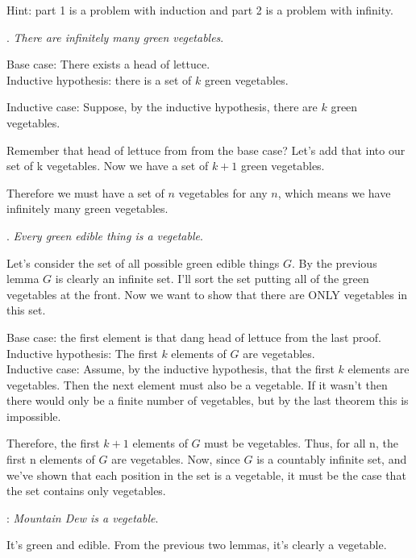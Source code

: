 \documentclass[basic, header]{nosvagor-notes}
\begin{document}
\begin{enumerate}[itemsep=4em]
    Hint: part 1 is a problem with induction and part 2 is a problem with
    infinity.

    . \textit{There are infinitely many green vegetables}.


    Base case: There exists a head of lettuce.\\
    Inductive hypothesis: there is a set of \(k\) green vegetables.\\

    Inductive case: Suppose, by the inductive hypothesis, there are \(k\) green vegetables.

    Remember that head of lettuce from from the base case? Let’s add that into our set of k vegetables.
    Now we have a set of \(k + 1\) green vegetables.

    Therefore we must have a set of \(n\) vegetables for any \(n\), which means
    we have infinitely many green vegetables. \tqed

    . \textit{Every green edible thing is a vegetable}.


    Let’s consider the set of all possible green edible things \(G\). By the
    previous lemma \(G\) is clearly an infinite set. I’ll sort the set putting all
    of the green vegetables at the front. Now we want to show that there are
    ONLY vegetables in this set.\\

    Base case: the first element is that dang head of lettuce from the last
    proof.\\ Inductive hypothesis: The first \(k\) elements of \(G\) are vegetables.\\
    Inductive case: Assume, by the inductive hypothesis, that the first \(k\)
    elements are vegetables. Then the next element must also be a vegetable. If
    it wasn't then there would only be a finite number of vegetables, but by
    the last theorem this is impossible.

    Therefore, the first \(k+1\) elements of \(G\) must be vegetables. Thus, for all
    n, the first n elements of \(G\) are vegetables. Now, since \(G\) is a countably
    infinite set, and we've shown that each position in the set is a vegetable,
    it must be the case that the set contains only vegetables.

    : \textit{Mountain Dew is a vegetable}.


    It’s green and edible. From the previous two lemmas, it’s clearly a vegetable. \tqed

\end{enumerate}
\end{document}
